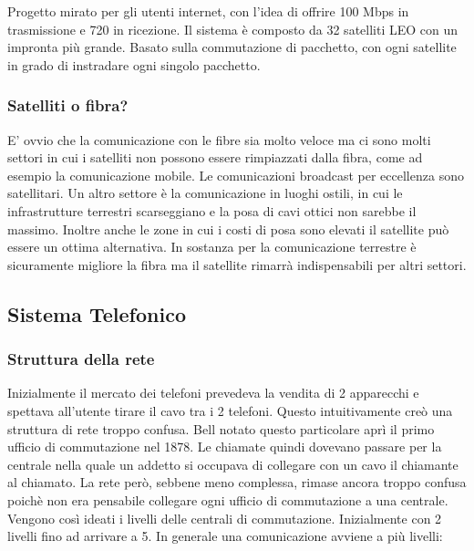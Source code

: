 Progetto mirato per gli utenti internet, con l'idea di offrire 100 Mbps in trasmissione e 720 in ricezione. Il sistema è composto da 32 satelliti LEO con un impronta più grande. Basato sulla commutazione di pacchetto, con ogni satellite in grado di instradare ogni singolo pacchetto.

\subsubsection{Satelliti o fibra?}

E' ovvio che la comunicazione con le fibre sia molto veloce ma ci sono molti settori in cui i satelliti non possono essere rimpiazzati dalla fibra, come ad esempio la comunicazione mobile. Le comunicazioni broadcast per eccellenza sono satellitari. Un altro settore è la comunicazione in luoghi ostili, in cui le infrastrutture terrestri scarseggiano e la posa di cavi ottici non sarebbe il massimo. Inoltre anche le zone in cui i costi di posa sono elevati il satellite può essere un ottima alternativa. In sostanza per la comunicazione terrestre è sicuramente migliore la fibra ma il satellite rimarrà indispensabili per altri settori.

\subsection{Sistema Telefonico}

\subsubsection{Struttura della rete}

Inizialmente il mercato dei telefoni prevedeva la vendita di 2 apparecchi e spettava all'utente tirare il cavo tra i 2 telefoni. Questo intuitivamente creò una struttura di rete troppo confusa. Bell notato questo particolare aprì il primo ufficio di commutazione nel 1878. Le chiamate quindi dovevano passare per la centrale nella quale un addetto si occupava di collegare con un cavo il chiamante al chiamato. La rete però, sebbene meno complessa, rimase ancora troppo confusa poichè non era pensabile collegare ogni ufficio di commutazione a una centrale. Vengono così ideati i livelli delle centrali di commutazione. Inizialmente con 2 livelli fino ad arrivare a 5. In generale una comunicazione avviene a più livelli:

